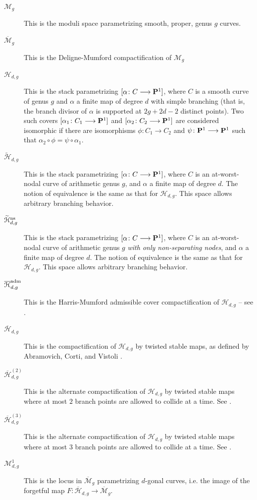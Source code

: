 \documentclass[reqno, 10 pt]{article}
\theoremstyle{definition}
\theoremstyle{remark}
\numberwithin{equation}{section}
\numberwithin{thm}{section}
\numberwithin{prop}{section}
\numberwithin{lem}{section}
\numberwithin{cor}{section}
\numberwithin{conj}{section}
\numberwithin{defn}{section}
\newcommand{\M}{\mathcal M}
\renewcommand{\H}{\mathcal H}
\newcommand{\td}{\widetilde}
\newcommand{\Hdg}{\overline{\H}_{d,g}}
\newcommand{\Hdgn}{\overline{\H}_{d,g}}
\newcommand{\Hdgnt}{\overline{\H}_{d,g}^{(2)}}
\newcommand{\Hdgnth}{\overline{\H}_{d,g}^{(3)}}
\renewcommand{\to}{\longrightarrow}
\newcommand{\Mg}{{\overline{\mathcal{M}}_{g}}}
\renewcommand{\P}{{\bf P}}
\newcommand {\from}{{\colon}}
\renewcommand{\H}{{\mathcal{H}}}
\newcommand {\ns}{{\rm ns}}
\begin{document}
  \begin{description}
  \item [$\M_{g}$] This is the moduli space parametrizing smooth, proper, genus $g$ curves.
  \\
  \item [$\Mg$] This is the Deligne-Mumford compactification of $\M_{g}$
  \\
  \item [$\H_{d,g}$] This is the stack parametrizing $[\alpha \from C \to \P^1]$, where $C$ is a smooth curve of genus $g$ and $\alpha$ a finite map of degree $d$ with simple branching (that is, the branch divisor of $\alpha$ is supported at $2g+2d-2$ distinct points). Two such covers $[\alpha_1 \from C_1 \to \P^1]$ and $[\alpha_2 \from C_2 \to \P^1]$ are considered isomorphic if there are isomorphisms $\phi \from C_1 \to C_2$ and $\psi \from \P^1 \to \P^1$ such that $\alpha_2 \circ \phi = \psi \circ \alpha_1$.
  \\

  \item [$\td \H_{d,g}$] This is the stack parametrizing $[\alpha \from C \to \P^1]$, where $C$ is an at-worst-nodal curve of arithmetic genus $g$, and $\alpha$ a finite map of degree $d$. The notion of equivalence is the same as that for $\H_{d,g}$. This space allows arbitrary branching behavior.
  \\
  \item [$\td \H_{d,g}^{\ns}$] This is the stack parametrizing $[\alpha \from C \to \P^1]$, where $C$ is an at-worst-nodal curve of arithmetic genus $g$ {\sl with only non-separating nodes}, and $\alpha$ a finite map of degree $d$. The notion of equivalence is the same as that for $\H_{d,g}$. This space allows arbitrary branching behavior.
  \\

  \item [$\overline{ \H}_{d,g}^{\rm{adm}}$] This is the Harris-Mumford admissible cover compactification of $\H_{d,g}$ -- see \cite{Harris82:_Kodair_Dimen_Of_Modul_Space_Of_Curves}. 
  \\


  \item[$\Hdgn$] This is the compactification of $\H_{d,g}$ by twisted stable maps, as defined by Abramovich, Corti, and Vistoli \cite{acv:03}. 
  \\
  \item[$\Hdgnt$] This is the alternate compactification of $\H_{d,g}$ by twisted stable maps where at most $2$ branch points are allowed to collide at a time. See \cite{deopurkar13:_compac_hurwit_spaces}. 
  \\
  \item[$\Hdgnth$] This is the alternate compactification of $\H_{d,g}$ by twisted stable maps where at most $3$ branch points are allowed to collide at a time. See \cite{deopurkar13:_compac_hurwit_spaces}. 
  \\


  \item[$\M^{1}_{d,g}$] This is the locus in $\Mg$ parametrizing $d$-gonal curves, i.e. the image of the forgetful map $F \from \Hdg \to \Mg$.

  \end{description}
\end{document}
